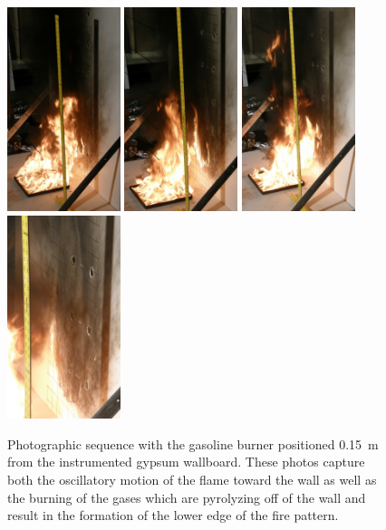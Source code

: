 \documentclass[twoside]{uocthesis}
\begin{document}
\begin{figure}[p]
	\includegraphics[width=1.3in]{../Figures/IWGBGAS6_Seq5}
	\includegraphics[width=1.3in]{../Figures/IWGBGAS6_Seq6}
	\includegraphics[width=1.3in]{../Figures/IWGBGAS6_Seq7}
	\includegraphics[width=1.3in]{../Figures/IWGBGAS6_Seq8} \\

	\caption[Photographs of motion of the flame with the gasoline burner positioned 0.15~m from the wall]{Photographic sequence with the gasoline burner positioned 0.15~m from the instrumented gypsum wallboard. These photos capture both the oscillatory motion of the flame toward the wall as well as the burning of the gases which are pyrolyzing off of the wall and result in the formation of the lower edge of the fire pattern.}
	\label{IWGBGAS6_seq}
\end{figure}
\end{document}
